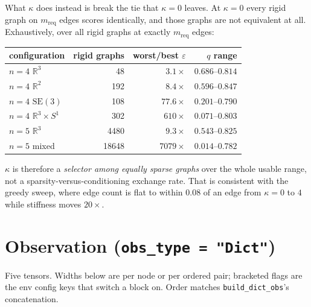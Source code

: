 \documentclass[11pt,a4paper]{article}
\newcommand{\R}{\mathbb{R}}
\newcommand{\SEthree}{\mathrm{SE}(3)}
\begin{document}
What $\kappa$ does instead is break the tie that $\kappa=0$ leaves. At $\kappa=0$ every
rigid graph on $m_{\text{req}}$ edges scores identically, and those graphs are not
equivalent at all. Exhaustively, over all rigid graphs at exactly $m_{\text{req}}$ edges:

\begin{center}
\begin{tabular}{lrrr}
\toprule
configuration & rigid graphs & worst/best $\varepsilon$ & $q$ range \\
\midrule
$n{=}4$ $\R^3$        &    48 &     $3.1\times$ & $0.686$--$0.814$ \\
$n{=}4$ $\R^2$        &   192 &     $8.4\times$ & $0.596$--$0.847$ \\
$n{=}4$ $\SEthree$    &   108 &    $77.6\times$ & $0.201$--$0.790$ \\
$n{=}4$ $\R^3\!\times\!S^1$ & 302 & $610\times$ & $0.071$--$0.803$ \\
$n{=}5$ $\R^3$        &  4480 &     $9.3\times$ & $0.543$--$0.825$ \\
$n{=}5$ mixed         & 18648 &  $7079\times$   & $0.014$--$0.782$ \\
\bottomrule
\end{tabular}
\end{center}

\noindent
$\kappa$ is therefore a \emph{selector among equally sparse graphs} over the whole usable
range, not a sparsity-versus-conditioning exchange rate. That is consistent with the greedy
sweep, where edge count is flat to within $0.08$ of an edge from $\kappa=0$ to $4$ while
stiffness moves $20\times$.

\section{Observation (\texttt{obs\_type = "Dict"})}

Five tensors. Widths below are per node or per ordered pair; bracketed flags are the env
config keys that switch a block on. Order matches \texttt{build\_dict\_obs}'s concatenation.
\end{document}

